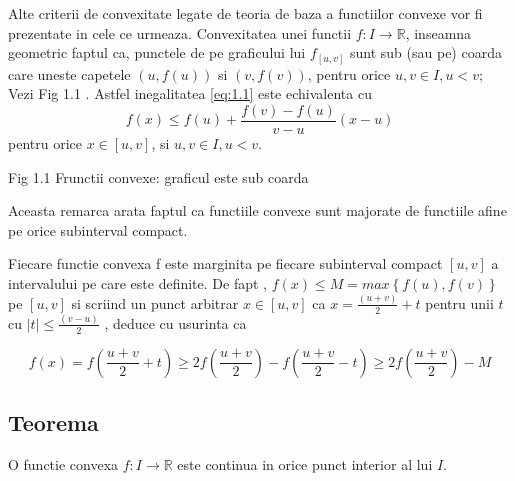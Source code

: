 \documentclass[a4paper,12pt,oneside]{report}
\begin{document}
Alte criterii de convexitate legate de teoria de baza a functiilor convexe vor fi prezentate in cele ce urmeaza. 
Convexitatea unei functii \(f : I\rightarrow \mathbb{R}\), inseamna geometric faptul ca, punctele de pe graficului lui  \(f_{\left [ u,v \right ]}\) sunt sub (sau pe) coarda care uneste capetele \(\left ( u , f {\left ( u \right )} \right )\)  si \(\left ( v , f {\left ( v \right )} \right )\), pentru orice \(u, v \in I, u < v\); 
Vezi Fig 1.1 . Astfel inegalitatea \ref{eq:1.1} este echivalenta cu 
\begin{displaymath}
  f\left ( x \right )\leq f\left ( u \right ) +\frac{f\left ( v \right )- f\left ( u \right )}{v - u}\left ( x - u \right ) \label{eq:1.2} \tag{1.2}
\end{displaymath}
pentru orice \(x\in \left [  u, v\right ]\), si \(u, v \in I, u < v\). 

%
%
Fig 1.1 Frunctii convexe: graficul este sub coarda

Aceasta remarca arata faptul ca functiile convexe sunt majorate de functiile afine pe orice subinterval compact. 

Fiecare functie convexa f este marginita pe fiecare subinterval compact \(\left [ u , v \right ]\) a intervalului pe care este definite. De fapt , \(f\left ( x \right ) \leq  M = max \left \{ f\left ( u \right ), f\left ( v \right ) \right \}\)  pe \(\left [ u , v \right ]\)  si scriind un punct arbitrar \(x\in  \left [ u , v  \right ]\)  ca  \(x= \frac{\left ( u + v \right )}{2} + t\) pentru unii \(t\) cu \(\left | t \right |\leq \frac{\left ( v - u \right )}{2}\) , deduce cu usurinta ca 

\begin{displaymath}
  f\left ( x \right )=  f\left ( \frac{u+v}{2} + t\right )\geq 2 f\left ( \frac{u + v}{2} \right )- f\left ( \frac{u + v}{2} - t\right )\geq 2f\left ( \frac{u+v}{2} \right ) - M
\end{displaymath}

\subsection{Teorema}
O functie convexa \(f: I \rightarrow \mathbb{R}\) este continua in orice punct interior al lui \(I\). 	
\end{document}

